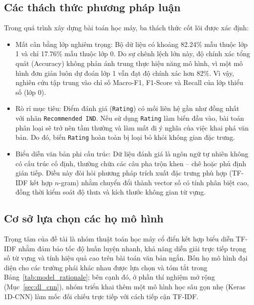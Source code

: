 \subsection{Các thách thức phương pháp luận}
Trong quá trình xây dựng bài toán học máy, ba thách thức cốt lõi được xác định:
\begin{itemize}
    \item Mất cân bằng lớp nghiêm trọng: Bộ dữ liệu có khoảng 82.24\% mẫu thuộc lớp 1 và chỉ 17.76\% mẫu thuộc lớp 0. Do sự chênh lệch lớn này, độ chính xác tổng quát (Accuracy) không phản ánh trung thực hiệu năng mô hình, vì một mô hình đơn giản luôn dự đoán lớp 1 vẫn đạt độ chính xác hơn 82\%. Vì vậy, nghiên cứu tập trung vào chỉ số Macro-F1, F1-Score và Recall của lớp thiểu số (lớp 0).
    \item Rò rỉ mục tiêu: Điểm đánh giá (\texttt{Rating}) có mối liên hệ gần như đồng nhất với nhãn \texttt{Recommended IND}. Nếu sử dụng \texttt{Rating} làm biến đầu vào, bài toán phân loại sẽ trở nên tầm thường và làm mất đi ý nghĩa của việc khai phá văn bản. Do đó, biến \texttt{Rating} hoàn toàn bị loại bỏ khỏi không gian đặc trưng.
    \item Biểu diễn văn bản phi cấu trúc: Dữ liệu đánh giá là ngôn ngữ tự nhiên không có cấu trúc cố định, thường chứa các câu pha trộn khen -- chê hoặc phủ định gián tiếp. Điều này đòi hỏi phương pháp trích xuất đặc trưng phù hợp (TF-IDF kết hợp $n$-gram) nhằm chuyển đổi thành vector số có tính phân biệt cao, đồng thời kiểm soát độ thưa và kích thước không gian từ vựng.
\end{itemize}

\subsection{Cơ sở lựa chọn các họ mô hình}
Trọng tâm của đề tài là nhóm thuật toán học máy cổ điển kết hợp biểu diễn TF-IDF nhằm đảm bảo tốc độ huấn luyện nhanh, khả năng diễn giải trực tiếp trọng số từ vựng và tính hiệu quả cao trên bài toán văn bản ngắn. Bốn họ mô hình đại diện cho các trường phái khác nhau được lựa chọn và tóm tắt trong Bảng~\ref{tab:model_rationale}; bên cạnh đó, ở phần thí nghiệm mở rộng (Mục~\ref{sec:dl_cnn}), nhóm triển khai thêm một mô hình học sâu gọn nhẹ (Keras 1D-CNN) làm mốc đối chiếu trực tiếp với cách tiếp cận TF-IDF.

